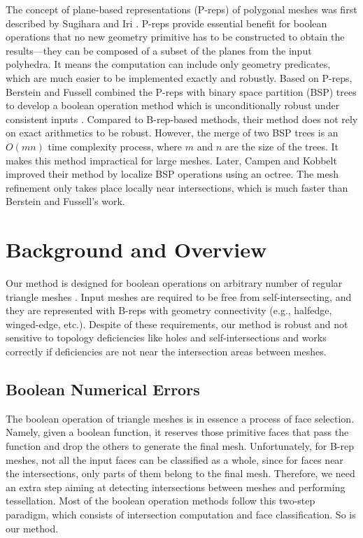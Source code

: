 \documentclass[10pt,journal,compsoc]{IEEEtran}
\begin{document}
The concept of plane-based representations (P-reps) of polygonal meshes was first described by Sugihara and Iri \cite{sugihara1990solid}. P-reps provide essential benefit for boolean operations that no new geometry primitive has to be constructed to obtain the results---they can be composed of a subset of the planes from the input polyhedra. It means the computation can include only geometry predicates, which are much easier to be implemented exactly and robustly. Based on P-reps, Berstein and Fussell \cite{bernstein2009fast} combined the P-reps with binary space partition (BSP) trees \cite{thibault1987set,naylor1990merging} to develop a boolean operation method which is unconditionally robust under consistent inputs . Compared to B-rep-based methods, their method does not rely on exact arithmetics to be robust. However, the merge of two BSP trees is an $O(mn)$ time complexity process, where $m$ and $n$ are the size of the trees. It makes this method impractical for large meshes. Later, Campen and Kobbelt \cite{campen2010exact} improved their method by localize BSP operations using an octree. The mesh refinement only takes place locally near intersections, which is much faster than Berstein and Fussell's work.


\section{Background and Overview}

\label{sec:overview}
Our method is designed for boolean operations on arbitrary number of regular triangle meshes \cite{requicha1985boolean}. Input meshes are required to be free from self-intersecting, and they are represented with B-reps with geometry connectivity (e.g., halfedge, winged-edge, etc.). Despite of these requirements, our method is robust and not sensitive to topology deficiencies like holes and self-intersections and works correctly if deficiencies are not near the intersection areas between meshes.


\subsection{Boolean Numerical Errors}
\label{sec:paradigm}

The boolean operation of triangle meshes is in essence a process of face selection. Namely, given a boolean function, it reserves those primitive faces that pass the function and drop the others to generate the final mesh. Unfortunately, for B-rep meshes, not all the input faces can be classified as a whole, since for faces near the intersections, only parts of them belong to the final mesh. Therefore, we need an extra step aiming at detecting intersections between meshes and performing tessellation. Most of the boolean operation methods follow this two-step paradigm, which consists of intersection computation and face classification. So is our method.
\end{document}
